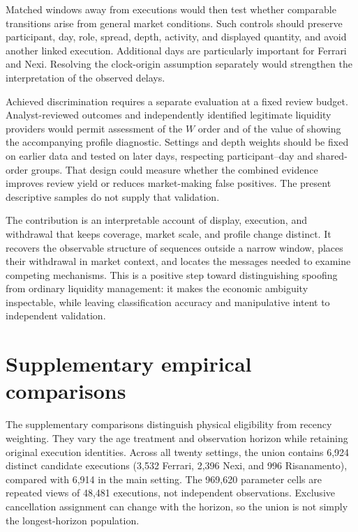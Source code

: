 \documentclass[11pt]{article}
\begin{document}
Matched windows away from executions would then test whether comparable transitions arise from general market conditions. Such controls should preserve participant, day, role, spread, depth, activity, and displayed quantity, and avoid another linked execution. Additional days are particularly important for Ferrari and Nexi. Resolving the clock-origin assumption separately would strengthen the interpretation of the observed delays.

Achieved discrimination requires a separate evaluation at a fixed review budget. Analyst-reviewed outcomes and independently identified legitimate liquidity providers would permit assessment of the $W$ order and of the value of showing the accompanying profile diagnostic. Settings and depth weights should be fixed on earlier data and tested on later days, respecting participant--day and shared-order groups. That design could measure whether the combined evidence improves review yield or reduces market-making false positives. The present descriptive samples do not supply that validation.



\begin{samepage}
The contribution is an interpretable account of display, execution, and withdrawal that keeps coverage, market scale, and profile change distinct. It recovers the observable structure of sequences outside a narrow window, places their withdrawal in market context, and locates the messages needed to examine competing mechanisms. This is a positive step toward distinguishing spoofing from ordinary liquidity management: it makes the economic ambiguity inspectable, while leaving classification accuracy and manipulative intent to independent validation.
\end{samepage}

\FloatBarrier


\clearpage
\appendix






\section{Supplementary empirical comparisons}
\label{sec:withdrawal_diagnostics}
The supplementary comparisons distinguish physical eligibility from recency weighting. They vary the age treatment and observation horizon while retaining original execution identities. Across all twenty settings, the union contains 6,924 distinct candidate executions (3,532 Ferrari, 2,396 Nexi, and 996 Risanamento), compared with 6,914 in the main setting. The 969,620 parameter cells are repeated views of 48,481 executions, not independent observations. Exclusive cancellation assignment can change with the horizon, so the union is not simply the longest-horizon population.
\end{document}
